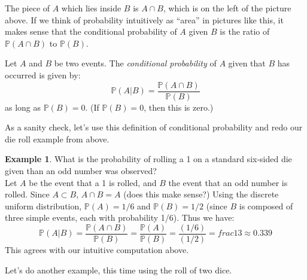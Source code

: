 \documentclass[12pt]{article}
\theoremstyle{definition}
\newtheorem*{example}{Example}
\theoremstyle{remark}
\def\P{{\mathbb P}}
\begin{document}
The piece of $A$ which lies inside $B$ is $A \cap B$, which is on the left of the picture above. If we think of probability intuitively as ``area'' in pictures like this, it makes sense that the conditional probability of $A$ given $B$ is the ratio of $\P(A \cap B)$ to $\P(B)$.

\begin{framed}
Let $A$ and $B$ be two events. The \emph{conditional probability} of $A$ given that $B$ has occurred is given by:
\[
\P(A|B) = \frac{\P(A \cap B)}{\P(B)}
\]
as long as $\P(B) = 0$. (If $\P(B) = 0$, then this is zero.)
\end{framed}

As a sanity check, let's use this definition of conditional probability and redo our die roll example from above.

\begin{example}What is the probability of rolling a 1 on a standard six-sided die given than an odd number was observed?\\

Let $A$ be the event that a 1 is rolled, and $B$ the event that an odd number is rolled. Since $A \subset B$, $A \cap B = A$ (does this make sense?) Using the discrete uniform distribution, $\P(A) = 1/6$ and $\P(B) = 1/2$ (since $B$ is composed of three simple events, each with probability 1/6).
Thus we have:
\[
\P(A|B) = \frac{ \P(A \cap B)}{\P(B)} = \frac{\P(A)}{\P(B)} = \frac{(1/6)}{(1/2)} = frac{1}{3} \approx 0.339
\]
This agrees with our intuitive computation above.
\end{example}

Let's do another example, this time using the roll of two dice.
\end{document}
